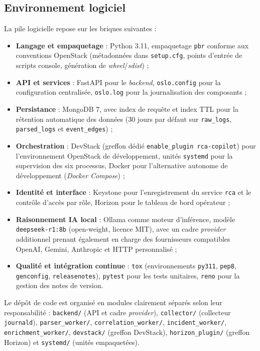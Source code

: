\documentclass[a4paper,11pt,oneside]{report}
\begin{document}
\subsection{Environnement logiciel}
La pile logicielle repose sur les briques suivantes :
\begin{itemize}
    \item \textbf{Langage et empaquetage} : Python 3.11, empaquetage \texttt{pbr} conforme aux conventions OpenStack (métadonnées dans \texttt{setup.cfg}, points d'entrée de scripts console, génération de \emph{wheel}/\emph{sdist}) ;
    \item \textbf{API et services} : FastAPI pour le \emph{backend}, \texttt{oslo.config} pour la configuration centralisée, \texttt{oslo.log} pour la journalisation des composants ;
    \item \textbf{Persistance} : MongoDB 7, avec index de requête et index TTL pour la rétention automatique des données (30 jours par défaut sur \texttt{raw\_logs}, \texttt{parsed\_logs} et \texttt{event\_edges}) ;
    \item \textbf{Orchestration} : DevStack (greffon dédié \texttt{enable\_plugin rca-copilot}) pour l'environnement OpenStack de développement, unités \texttt{systemd} pour la supervision des six processus, Docker pour l'alternative autonome de développement (\emph{Docker Compose}) ;
    \item \textbf{Identité et interface} : Keystone pour l'enregistrement du service \texttt{rca} et le contrôle d'accès par rôle, Horizon pour le tableau de bord opérateur ;
    \item \textbf{Raisonnement IA local} : Ollama comme moteur d'inférence, modèle \texttt{deepseek-r1:8b} (open-weight, licence MIT), avec un cadre \emph{provider} additionnel prenant également en charge des fournisseurs compatibles OpenAI, Gemini, Anthropic et HTTP personnalisé ;
    \item \textbf{Qualité et intégration continue} : \texttt{tox} (environnements \texttt{py311}, \texttt{pep8}, \texttt{genconfig}, \texttt{releasenotes}), \texttt{pytest} pour les tests unitaires, \texttt{reno} pour la gestion des notes de version.
\end{itemize}
Le dépôt de code est organisé en modules clairement séparés selon leur responsabilité : \texttt{backend/} (API et cadre \emph{provider}), \texttt{collector/} (collecteur \texttt{journald}), \texttt{parser\_worker/}, \texttt{correlation\_worker/}, \texttt{incident\_worker/}, \texttt{enrichment\_worker/}, \texttt{devstack/} (greffon DevStack), \texttt{horizon\_plugin/} (greffon Horizon) et \texttt{systemd/} (unités empaquetées).
\end{document}
